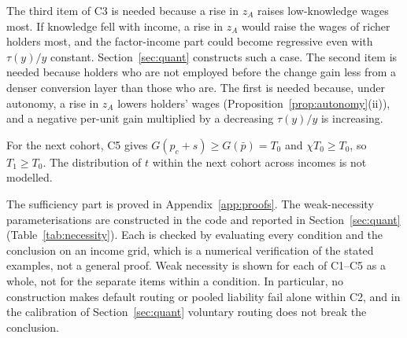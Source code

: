 \documentclass[12pt]{article}
\theoremstyle{remark}
\begin{document}
The third item of C3 is needed because a rise in $z_A$ raises low-knowledge wages most. If knowledge fell with income, a rise in $z_A$ would raise the wages of richer holders most, and the factor-income part could become regressive even with $\tau(y)/y$ constant. Section~\ref{sec:quant} constructs such a case. The second item is needed because holders who are not employed before the change gain less from a denser conversion layer than those who are. The first is needed because, under autonomy, a rise in $z_A$ lowers holders' wages (Proposition~\ref{prop:autonomy}(ii)), and a negative per-unit gain multiplied by a decreasing $\tau(y)/y$ is increasing.

For the next cohort, C5 gives $G(p_c+s)\ge G(\bar p)=T_0$ and $\chi T_0\ge T_0$, so $T_1\ge T_0$. The distribution of $t$ within the next cohort across incomes is not modelled.

The sufficiency part is proved in Appendix~\ref{app:proofs}. The weak-necessity parameterisations are constructed in the code and reported in Section~\ref{sec:quant} (Table~\ref{tab:necessity}). Each is checked by evaluating every condition and the conclusion on an income grid, which is a numerical verification of the stated examples, not a general proof. Weak necessity is shown for each of C1--C5 as a whole, not for the separate items within a condition. In particular, no construction makes default routing or pooled liability fail alone within C2, and in the calibration of Section~\ref{sec:quant} voluntary routing does not break the conclusion.
\end{document}
